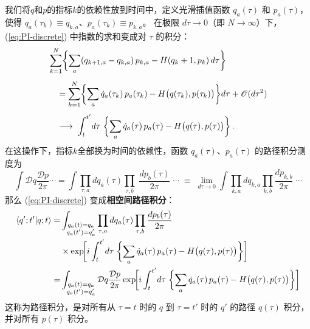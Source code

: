 \medskip\noindent
我们将$q$和$p$的指标$k$的依赖性放到时间中，定义光滑插值函数 $q_a(\tau)$ 和 $p_a(\tau)$，
使得 $q_a(\tau_k)\equiv q_{k,a}$、$p_a(\tau_k)\equiv p_{k,a}$。
在极限 $d\tau\to 0$（即 $N\to\infty$）下，
(\ref{eq:PI-discrete}) 中指数的求和变成对 $\tau$ 的积分：
\begin{align}
  &\sum_{k=1}^{N}\biggl\{
    \sum_a(q_{k+1,a}-q_{k,a})\,p_{k,a}
    -H(q_k+1,p_{k})\,d\tau
  \biggr\}
  \notag\\[4pt]
  &\quad=\sum_{k=1}^{N}\biggl\{
    \sum_a\dot{q}_a(\tau_k)\,p_a(\tau_k)
    -H\bigl(q(\tau_k),p(\tau_k)\bigr)
  \biggr\}d\tau + \mathscr{O}(d\tau^2)
  \notag\\[4pt]
  &\quad\longrightarrow\;
  \int_{t}^{t'}\!d\tau\;\biggl\{
    \sum_a\dot{q}_a(\tau)\,p_a(\tau)
    -H\bigl(q(\tau),p(\tau)\bigr)
  \biggr\}\,.
  \label{eq:cont-limit}
\end{align}
在这操作下，指标$k$全部换为时间的依赖性，函数 $q_a(\tau)$、$p_a(\tau)$ 的路径积分测度为
\begin{equation}\label{eq:measure}
  \int \mathcal{D}q\frac{\mathcal{D}p}{2\pi}\cdots=\int\prod_{\tau,a}dq_a(\tau)
    \prod_{\tau,b}\;\frac{dp_b(\tau)}{2\pi}\;\cdots
  \;\equiv\;
  \lim_{d\tau\to 0}\int
    \prod_{k,a}dq_{k,a}
    \prod_{k,b}\frac{dp_{k,b}}{2\pi}\;\cdots
\end{equation}
那么 (\ref{eq:PI-discrete}) 变成\textbf{相空间路径积分}：
\begin{equation}\label{eq:PI-phase}
  \begin{aligned}
  \braket{q';t'|q;t}
  =&\int_{\substack{q_a(t)=q_a\\q_a(t')=q'_a}}
    \prod_{\tau,a}dq_a(\tau)
    \prod_{\tau,b}\frac{dp_b(\tau)}{2\pi}\\
    &\times\exp\!\biggl[
    i\int_{t}^{t'}\!d\tau\;\biggl\{
      \sum_a\dot{q}_a(\tau)\,p_a(\tau)
      -H\bigl(q(\tau),p(\tau)\bigr)
    \biggr\}
  \biggr]\\
  =&\int_{\substack{q_a(t)=q_a\\q_a(t')=q'_a}}
    \mathcal{D}q\frac{\mathcal{D}p}{2\pi}\exp\!\biggl[
    i\int_{t}^{t'}\!d\tau\;\biggl\{
      \sum_a\dot{q}_a(\tau)\,p_a(\tau)
      -H\bigl(q(\tau),p(\tau)\bigr)
    \biggr\}
  \biggr]\\
  \end{aligned}
\end{equation}
这称为路径积分，是对所有从 $\tau=t$ 时的 $q$
到 $\tau=t'$ 时的 $q'$ 的路径 $q(\tau)$ 积分，
并对所有 $p(\tau)$ 积分。
\medskip



